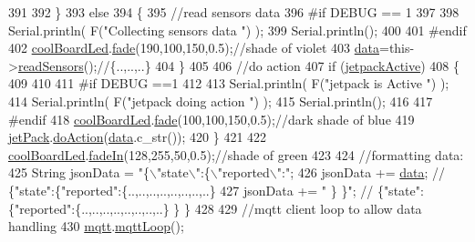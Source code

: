 \begin{DoxyCode}
391                 
392     \}   
393     \textcolor{keywordflow}{else}
394     \{
395         \textcolor{comment}{//read sensors data}
396 \textcolor{preprocessor}{    #if DEBUG == 1}
397 
398         Serial.println( F(\textcolor{stringliteral}{"Collecting sensors data "}) );
399         Serial.println();
400     
401 \textcolor{preprocessor}{    #endif}
402         \hyperlink{class_cool_board_a1b1d3c684a5baa56b08486e192fd8e97}{coolBoardLed}.\hyperlink{class_cool_board_led_af1cacbaa88db8bcf6042c1083ba41155}{fade}(190,100,150,0.5);\textcolor{comment}{//shade of violet        }
403         \hyperlink{class_cool_board_a427fb753dd8575bdf821c70a5c63d695}{data}=this->\hyperlink{class_cool_board_ad03abdce2e65f520bbf2cff0f2d083cf}{readSensors}();\textcolor{comment}{//\{..,..,..\}}
404     \}
405     
406     \textcolor{comment}{//do action}
407     \textcolor{keywordflow}{if} (\hyperlink{class_cool_board_a9be03a913d26e558328935ca3b59a75e}{jetpackActive})
408     \{
409 
410 
411 \textcolor{preprocessor}{    #if DEBUG ==1}
412 
413         Serial.println( F(\textcolor{stringliteral}{"jetpack is Active "}) );
414         Serial.println( F(\textcolor{stringliteral}{"jetpack doing action "}) );
415         Serial.println();
416 
417 \textcolor{preprocessor}{    #endif}
418         \hyperlink{class_cool_board_a1b1d3c684a5baa56b08486e192fd8e97}{coolBoardLed}.\hyperlink{class_cool_board_led_af1cacbaa88db8bcf6042c1083ba41155}{fade}(100,100,150,0.5);\textcolor{comment}{//dark shade of blue     }
419         \hyperlink{class_cool_board_a30b1357881b01ccbec676856a91e48e9}{jetPack}.\hyperlink{class_jetpack_a9e703197093094b963f9ad57817495b8}{doAction}(\hyperlink{class_cool_board_a427fb753dd8575bdf821c70a5c63d695}{data}.c\_str());
420     \}
421     
422     \hyperlink{class_cool_board_a1b1d3c684a5baa56b08486e192fd8e97}{coolBoardLed}.\hyperlink{class_cool_board_led_ab778f5e7bed0ab74e3906d82110493c3}{fadeIn}(128,255,50,0.5);\textcolor{comment}{//shade of green}
423 
424     \textcolor{comment}{//formatting data:}
425     String jsonData = \textcolor{stringliteral}{"\{\(\backslash\)"state\(\backslash\)":\{\(\backslash\)"reported\(\backslash\)":"};
426     jsonData += \hyperlink{class_cool_board_a427fb753dd8575bdf821c70a5c63d695}{data}; \textcolor{comment}{// \{"state":\{"reported":\{..,..,..,..,..,..,..,..\}}
427     jsonData += \textcolor{stringliteral}{" \} \}"}; \textcolor{comment}{// \{"state":\{"reported":\{..,..,..,..,..,..,..,..\}  \} \}}
428     
429     \textcolor{comment}{//mqtt client loop to allow data handling}
430     \hyperlink{class_cool_board_a2399f44d7c23c1149a335cb3b46d90f1}{mqtt}.\hyperlink{class_cool_m_q_t_t_aa5eaae967b562b62cbcf2b8d81f6e5d5}{mqttLoop}();

\end{DoxyCode}
